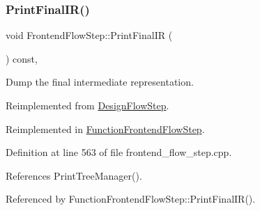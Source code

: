 \mbox{\label{classFrontendFlowStep_a2a9b475fe6e3739803cb4e6afdc94a01}} 
\subsubsection{\texorpdfstring{Print\+Final\+I\+R()}{PrintFinalIR()}}
{\footnotesize\ttfamily void Frontend\+Flow\+Step\+::\+Print\+Final\+IR (\begin{DoxyParamCaption}{ }\end{DoxyParamCaption}) const\hspace{0.3cm}{\ttfamily [override]}, {\ttfamily [virtual]}}



Dump the final intermediate representation. 



Reimplemented from \hyperlink{classDesignFlowStep_a1d30b6b575c459521803a388a2085d60}{Design\+Flow\+Step}.



Reimplemented in \hyperlink{classFunctionFrontendFlowStep_abe2dc98fddb94bebf12a91e8c78f9dcc}{Function\+Frontend\+Flow\+Step}.



Definition at line 563 of file frontend\+\_\+flow\+\_\+step.\+cpp.



References Print\+Tree\+Manager().



Referenced by Function\+Frontend\+Flow\+Step\+::\+Print\+Final\+I\+R().

